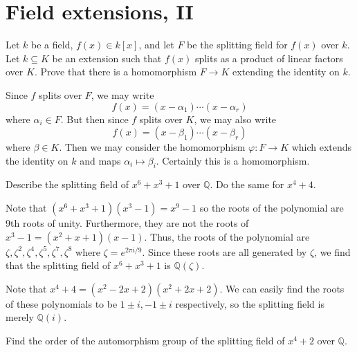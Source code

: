 \documentclass[../../master.tex]{subfiles}
\begin{document}
\section{Field extensions, II}

\begin{problem}
    Let $k$ be a field, $f(x) \in k[x]$, and let $F$ be the splitting field for $f(x)$ over $k$.
    Let $k \subseteq K$ be an extension such that $f(x)$ splits as a product of linear factors over $K$.
    Prove that there is a homomorphism $F \to K$ extending the identity on $k$.
\end{problem}

\begin{solution}
    Since $f$ splits over $F$, we may write
    \[
        f(x) = (x - \alpha_1) \cdots (x - \alpha_r)
    \]
    where $\alpha_i \in F$.
    But then since $f$ splits over $K$, we may also write
    \[
        f(x) = (x - \beta_1) \cdots (x - \beta_r)
    \]
    where $\beta \in K$.
    Then we may consider the homomorphism $\varphi: F \to K$ which extends the identity on $k$ and maps $\alpha_i \mapsto \beta_i$.
    Certainly this is a homomorphism.
\end{solution}

\begin{problem}
    Describe the splitting field of $x^6 + x^3 + 1$ over $\mathbb{Q}$.
    Do the same for  $x^{4} + 4$.
\end{problem}

\begin{solution}
    Note that $(x^{6} + x^3 + 1)(x^3 - 1) = x^{9} - 1$ so the roots of the polynomial are 9th roots of unity.
    Furthermore, they are not the roots of $x^3 - 1 = (x^2 + x + 1) (x - 1)$.
    Thus, the roots of the polynomial are $\zeta, \zeta^2, \zeta^{4}, \zeta^{5}, \zeta^{7}, \zeta^{8}$ where $\zeta = e^{2\pi i / 9}$.
    Since these roots are all generated by $\zeta$, we find that the splitting field of $x^{6} + x^3 + 1$ is $\mathbb{Q}(\zeta)$.

    Note that $x^{4} + 4 = (x^2 - 2x + 2) (x^2 + 2x + 2)$.
    We can easily find the roots of these polynomials to be $1 \pm i, -1 \pm i$ respectively, so the splitting field is merely $\mathbb{Q}(i)$.
\end{solution}

\begin{problem}
    Find the order of the automorphism group of the splitting field of $x^{4} + 2$ over $\mathbb{Q}$.
\end{problem}
\end{document}
